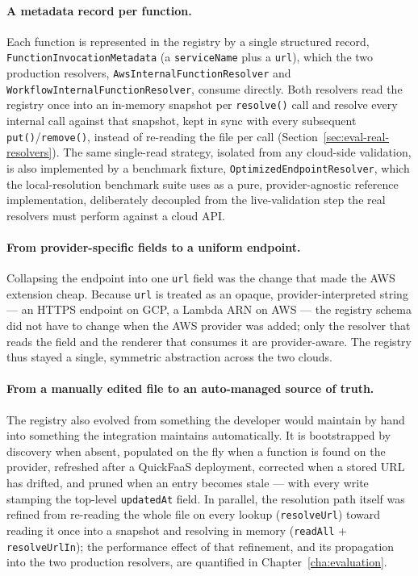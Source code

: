 \paragraph{A metadata record per function.}
Each function is represented in the registry by a single structured record,
\texttt{FunctionInvocationMetadata} (a \texttt{serviceName} plus a \texttt{url}), which the two
production resolvers, \texttt{Aws\allowbreak Internal\allowbreak Function\allowbreak Resolver} and
\texttt{Workflow\allowbreak Internal\allowbreak Function\allowbreak Resolver}, consume directly.
Both resolvers read the registry once into an in-memory snapshot per \texttt{resolve()} call and
resolve every internal call against that snapshot, kept in sync with every subsequent
\texttt{put()}/\texttt{remove()}, instead of re-reading the file per call
(Section~\ref{sec:eval-real-resolvers}). The same single-read strategy, isolated from any
cloud-side validation, is also implemented by a benchmark fixture,
\texttt{OptimizedEndpointResolver}, which the local-resolution benchmark suite uses as a pure,
provider-agnostic reference implementation, deliberately decoupled from the live-validation step
the real resolvers must perform against a cloud API.

\paragraph{From provider-specific fields to a uniform endpoint.}
Collapsing the endpoint into one \texttt{url} field was the change that made the AWS extension
cheap. Because \texttt{url} is treated as an opaque, provider-interpreted string --- an HTTPS
endpoint on GCP, a Lambda ARN on AWS --- the registry schema did not have to change when the AWS
provider was added; only the resolver that reads the field and the renderer that consumes it are
provider-aware. The registry thus stayed a single, symmetric abstraction across the two clouds.

\paragraph{From a manually edited file to an auto-managed source of truth.}
The registry also evolved from something the developer would maintain by hand into something the
integration maintains automatically. It is bootstrapped by discovery when absent, populated on the
fly when a function is found on the provider, refreshed after a QuickFaaS deployment, corrected when
a stored URL has drifted, and pruned when an entry becomes stale --- with every write stamping the
top-level \texttt{updatedAt} field. In parallel, the resolution path itself was refined from
re-reading the whole file on every lookup (\texttt{resolveUrl}) toward reading it once into a
snapshot and resolving in memory (\texttt{readAll} + \texttt{resolveUrlIn}); the performance effect
of that refinement, and its propagation into the two production resolvers, are quantified in
Chapter~\ref{cha:evaluation}.

